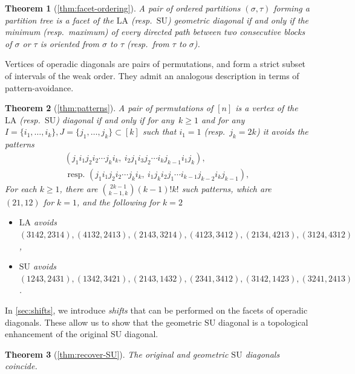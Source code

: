 \documentclass{amsart}
\newtheorem*{theorem*}{Theorem}
\theoremstyle{definition}
\newcommand{\resp}{resp.~} %
\newcommand{\SU}{\mathrm{SU}}
\newcommand{\LA}{\mathrm{LA}}
\begin{document}
\begin{theorem*}[\cref{thm:facet-ordering}]
A pair of ordered partitions $(\sigma,\tau)$ forming a partition tree is a facet of the $\LA$ (\resp $\SU$) geometric diagonal if and only if the minimum (\resp maximum) of every directed path between two consecutive blocks of $\sigma$ or $\tau$ is oriented from $\sigma$ to $\tau$ (\resp from $\tau$ to $\sigma$).
\end{theorem*}

\pagebreak
Vertices of operadic diagonals are pairs of permutations, and form a strict subset of intervals of the weak order. 
They admit an analogous description in terms of pattern-avoidance. 

\begin{theorem*}[\cref{thm:patterns}]
A pair of permutations of $[n]$ is a vertex of the $\LA$ (\resp $\SU$) diagonal if and only if for any~$k\geq 1$ and for any $I=\{i_1, \dots, i_k\},J=\{j_1, \dots, j_k\} \subset [k]$ such that $i_1=1$ (\resp $j_k=2k$) it avoids the patterns 
\begin{align}
	(j_1 i_1 j_2 i_2 \cdots j_k i_k,\ i_2 j_1 i_3 j_2 \cdots i_k j_{k-1} i_1 j_k), \tag{LA} \\
	\text{ \resp } (j_1 i_1 j_2 i_2 \cdots j_k i_k, \ i_1 j_k i_2 j_1 \cdots i_{k-1} j_{k-2}i_k j_{k-1}), \tag{SU}
\end{align}
For each $k \ge 1$, there are $\binom{2k-1}{k-1,k}(k-1)!k!$ such patterns, which are $(21,12)$ for $k=1$, and the following for $k=2$
\begin{itemize}
	\item $\LA$ avoids 
	$(3142,2314), (4132,2413),
	(2143,3214), (4123,3412),
	(2134,4213), (3124,4312)$,
	\item $\SU$ avoids 
	$(1243,2431),(1342,3421),
	(2143,1432),(2341,3412),
	(3142,1423),(3241,2413)$.
\end{itemize}
\end{theorem*}

In \cref{sec:shifts}, we introduce \emph{shifts} that can be performed on the facets of operadic diagonals.
These allow us to show that the geometric $\SU$ diagonal is a topological enhancement of the original $\SU$ diagonal. 

\begin{theorem*}[\cref{thm:recover-SU}]
The original and geometric $\SU$ diagonals coincide. 
\end{theorem*}
\end{document}
